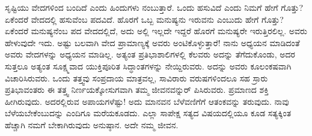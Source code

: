 \vskip 0.5cm

ಸೃಷ್ಟಿಯು ವೇದಗಳಿಂದ ಬಂದಿದೆ ಎಂದು ಹಿಂದುಗಳು ನಂಬುತ್ತಾರೆ. ಒಂದು ಹಸುವಿದೆ ಎಂದು ನಿಮಗೆ ಹೇಗೆ ಗೊತ್ತು? ಏಕೆಂದರೆ ವೇದದಲ್ಲಿ ಹಸುವೆಂಬ ಪದವಿದೆ. ಹೊರಗೆ ಒಬ್ಬ ಮನುಷ್ಯನು ಇರುವನು ಎಂಬುದು ಹೇಗೆ ಗೊತ್ತು? ಏಕೆಂದರೆ ಮನುಷ್ಯನೆಂಬ ಪದ ವೇದದಲ್ಲಿದೆ, ಅದು ಅಲ್ಲಿ ಇಲ್ಲದೇ ಇದ್ದರೆ ಹೊರಗೆ ಮನುಷ್ಯರೇ ಇರುತ್ತಿರಲಿಲ್ಲ. ಅವರು ಹೇಳುವುದೇ ಇದು. ಅಷ್ಟು ಬಲವಾಗಿ ವೇದ ಪ್ರಾಮಾಣ್ಯಕ್ಕೆ ಅವರು ಅಂಟಿಕೊಳ್ಳುತ್ತಾರೆ! ನಾನು ಅಧ್ಯಯನ ಮಾಡಿದಂತೆ ಅವರು ವೇದಗಳನ್ನು ಅಧ್ಯಯನ ಮಾಡಿಲ್ಲ. ಅತ್ಯಂತ ಪ್ರತಿಭಾಶಾಲಿಗಳಲ್ಲಿ ಕೆಲವರು ಅದನ್ನು ತೆಗೆದುಕೊಂಡು, ಅದರ ಸುತ್ತಲೂ ಅತ್ಯಂತ ಸೂಕ್ಷ್ಮವಾದ ಯುಕ್ತಿಪೂರಿತ ಸಿದ್ಧಾಂತಗಳನ್ನು ನೇಯ್ದಿರುವರು. ಅದನ್ನು ಅವರು ಕೂಲಂಕಷವಾಗಿ ವಿಚಾರಿಸಿರುವರು. ಒಂದು ತತ್ತ್ವವು ಸಂಪ್ರದಾಯ ಮಾತ್ರವಲ್ಲ, ಸಾವಿರಾರು ವರುಷಗಳಿಂದಲೂ ಸಹ ಸ್ರಾರು ಪ್ರತಿಭಾವಂತರು ಈ ತತ್ತ್ವ ನಿರ್ಣಯಕ್ಕೋಸುಗವಾಗಿ ತಮ್ಮ ಜೀವನವನ್ನುರ್ ಪಿಸಿರುವರು. ಪ್ರಮಾಣದ ಶಕ್ತಿ ಹೀಗಿರುವುದು. ಅದರಲ್ಲಿರುವ ಅಪಾಯಗಳೆಷ್ಟು! ಅದು ಮಾನವನ ಬೆಳೆವಣಿಗೆಗೆ ಆತಂಕವನ್ನು ತರುವುದು. ನಾವು ಬೆಳೆಯಬೇಕೆಂಬುದನ್ನು ಎಂದಿಗೂ ಮರೆಯಕೂಡದು. ಎಲ್ಲಾ ಸಾಪೇಕ್ಷ ಸತ್ಯದ ವಿಷಯದಲ್ಲಿಯೂ ಕೂಡ ಸತ್ಯಕ್ಕಿಂತ ಹೆಚ್ಚಾಗಿ ನಮಗೆ ಬೇಕಾಗಿರುವುದು ಅನುಷ್ಠಾನ. ಅದೇ ನಮ್ಮ ಜೀವನ. 

\vskip 0.5cm

